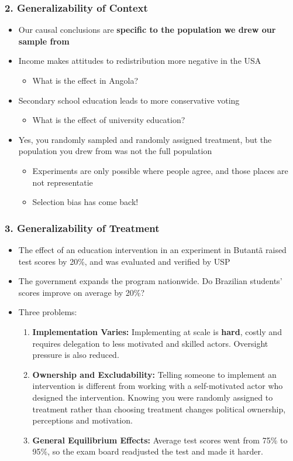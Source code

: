 \documentclass[xcolor=x11names,compress]{beamer}\usepackage[]{graphicx}\usepackage[]{color}
\renewcommand{\(}{\begin{columns}}
\renewcommand{\)}{\end{columns}}
\newcommand{\<}[1]{\begin{column}{#1}}
\renewcommand{\>}{\end{column}}
\begin{document}
\begin{frame}
\frametitle{2. Generalizability of Context}
\begin{itemize}
\item Our causal conclusions are \textbf{specific to the population we drew our sample from}
\pause
\item Income makes attitudes to redistribution more negative in the USA
\pause
\begin{itemize}
\item What is the effect in Angola?
\end{itemize}
\pause
\item Secondary school education leads to more conservative voting
\pause
\begin{itemize}
\item What is the effect of university education?
\end{itemize}
\pause
\item Yes, you randomly sampled and randomly assigned treatment, but the population you drew from was not the full population
\pause
\begin{itemize}
\item Experiments are only possible where people agree, and those places are not representatie
\pause
\item Selection bias has come back!
\end{itemize}
\end{itemize}
\end{frame}

\begin{frame}
\frametitle{3. Generalizability of Treatment}
\begin{itemize}
\item The effect of an education intervention in an experiment in Butant\~{a} raised test scores by 20\%, and was evaluated and verified by USP
\pause
\item The government expands the program nationwide. Do Brazilian students' scores improve on average by 20\%?
\pause
\item Three problems:
\begin{enumerate}
\item \textbf{Implementation Varies:} Implementing at scale is \textbf{hard}, costly and requires delegation to less motivated and skilled actors. Oversight pressure is also reduced.
\pause
\item \textbf{Ownership and Excludability:} Telling someone to implement an intervention is different from working with a self-motivated actor who designed the intervention. Knowing you were randomly assigned to treatment rather than choosing treatment changes political ownership, perceptions and motivation.
\pause
\item \textbf{General Equilibrium Effects:} Average test scores went from 75\% to 95\%, so the exam board readjusted the test and made it harder.
\end{enumerate}
\end{itemize}
\end{frame}
\end{document}
